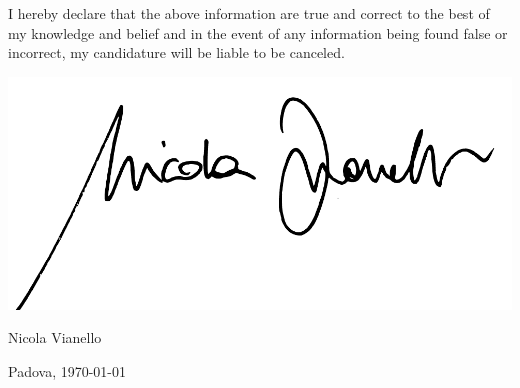 \section{}
I hereby declare that the above information are true and correct to the best of my knowledge
and belief and in the event of any information being found false or incorrect, my candidature will be liable to be
canceled.

\vspace{0.5cm}

\includegraphics[height=4.5\baselineskip]{signature} \par
Nicola Vianello \par
Padova, \today
